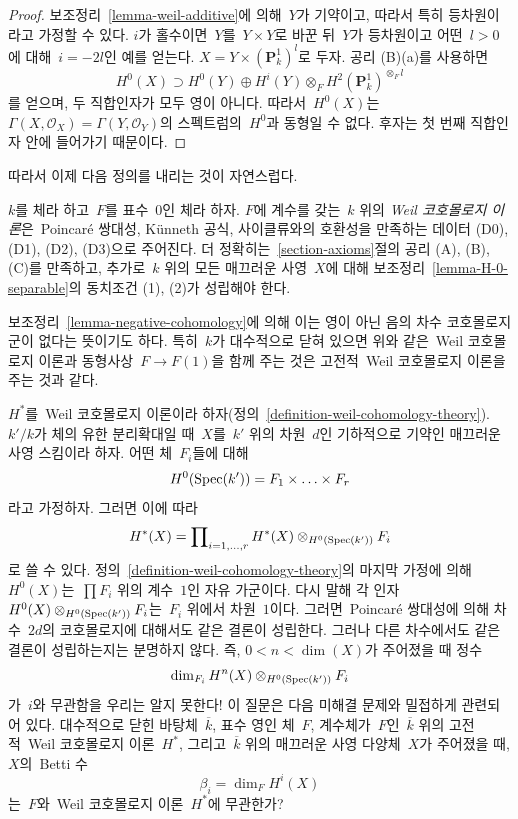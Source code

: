 \begin{proof}
보조정리\  \ref{lemma-weil-additive}에 의해\  $Y$가 기약이고, 따라서
특히 등차원이라고 가정할 수 있다. $i$가 홀수이면\  $Y$를\ 
$Y \times Y$로 바꾼 뒤\  $Y$가 등차원이고 어떤\  $l > 0$에 대해\ 
$i = -2l$인 예를 얻는다. $X = Y \times (\mathbf{P}^1_k)^l$로 두자.
공리 (B)(a)를 사용하면
$$
H^0(X) \supset H^0(Y) \oplus
H^i(Y) \otimes_F H^2(\mathbf{P}^1_k)^{\otimes_F l}
$$
를 얻으며, 두 직합인자가 모두 영이 아니다. 따라서\  $H^0(X)$는\ 
$\Gamma(X, \mathcal{O}_X) = \Gamma(Y, \mathcal{O}_Y)$의 스펙트럼의\ 
$H^0$과 동형일 수 없다. 후자는 첫 번째 직합인자 안에 들어가기
때문이다.
\end{proof}

\noindent
따라서 이제 다음 정의를 내리는 것이 자연스럽다.

\begin{definition}
\label{definition-weil-cohomology-theory}
$k$를 체라 하고\  $F$를 표수\  $0$인 체라 하자. $F$에 계수를 갖는\ 
$k$ 위의 {\it Weil 코호몰로지 이론}은\  Poincar\'e 쌍대성,
K\"unneth 공식, 사이클류와의 호환성을 만족하는 데이터 (D0), (D1),
(D2), (D3)으로 주어진다. 더 정확히는\  \ref{section-axioms}절의
공리 (A), (B), (C)를 만족하고, 추가로\  $k$ 위의 모든 매끄러운 사영\ 
$X$에 대해 보조정리\  \ref{lemma-H-0-separable}의 동치조건 (1), (2)가
성립해야 한다.
\end{definition}

\noindent
보조정리\  \ref{lemma-negative-cohomology}에 의해 이는 영이 아닌
음의 차수 코호몰로지군이 없다는 뜻이기도 하다. 특히\  $k$가
대수적으로 닫혀 있으면 위와 같은\  Weil 코호몰로지 이론과 동형사상\ 
$F \to F(1)$을 함께 주는 것은 고전적\  Weil 코호몰로지 이론을 주는
것과 같다.

\begin{remark}
\label{remark-betti-numbers-in-some-sense}
$H^*$를\  Weil 코호몰로지 이론이라 하자(정의\ 
\ref{definition-weil-cohomology-theory}). $k'/k$가 체의 유한
분리확대일 때\  $X$를\  $k'$ 위의 차원\  $d$인 기하적으로 기약인
매끄러운 사영 스킴이라 하자. 어떤 체\  $F_i$들에 대해
$$
H^0(\mathop{\mathrm{Spec}}(k')) = F_1 \times \ldots \times F_r
$$
라고 가정하자. 그러면 이에 따라
$$
H^*(X) = \prod\nolimits_{i = 1, \ldots, r}
H^*(X) \otimes_{H^0(\mathop{\mathrm{Spec}}(k'))} F_i
$$
로 쓸 수 있다. 정의\  \ref{definition-weil-cohomology-theory}의
마지막 가정에 의해\  $H^0(X)$는\  $\prod F_i$ 위의 계수\  $1$인 자유
가군이다. 다시 말해 각 인자\ 
$H^0(X) \otimes_{H^0(\mathop{\mathrm{Spec}}(k'))} F_i$는\  $F_i$ 위에서 차원\  $1$이다.
그러면\  Poincar\'e 쌍대성에 의해 차수\  $2d$의 코호몰로지에 대해서도
같은 결론이 성립한다. 그러나 다른 차수에서도 같은 결론이
성립하는지는 분명하지 않다. 즉, $0 < n < \dim(X)$가 주어졌을 때
정수
$$
\dim_{F_i} H^n(X) \otimes_{H^0(\mathop{\mathrm{Spec}}(k'))} F_i
$$
가\  $i$와 무관함을 우리는 알지 못한다! 이 질문은 다음 미해결 문제와
밀접하게 관련되어 있다. 대수적으로 닫힌 바탕체\  $\overline{k}$,
표수 영인 체\  $F$, 계수체가\  $F$인\  $\overline{k}$ 위의 고전적\  Weil
코호몰로지 이론\  $H^*$, 그리고\  $\overline{k}$ 위의 매끄러운 사영
다양체\  $X$가 주어졌을 때, $X$의\  Betti 수
$$
\beta_i = \dim_F H^i(X)
$$
는\  $F$와\  Weil 코호몰로지 이론\  $H^*$에 무관한가?
\end{remark}

